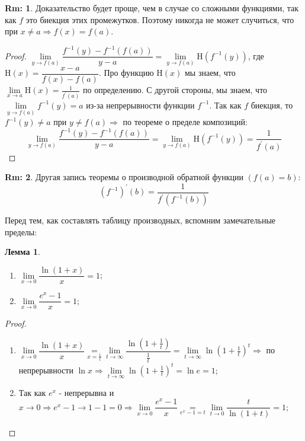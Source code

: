 \documentclass[12pt]{article}
\newcommand{\MH}{\mathrm{H}}
\theoremstyle{definition}
\newtheorem{rem}{Rm:}
\newtheorem{lemma}{Лемма}
\begin{document}
\begin{rem}
	Доказательство будет проще, чем в случае со сложными функциями, так как $f$ это биекция этих промежутков. Поэтому никогда не может случиться, что при $x\neq a \Rightarrow f(x) = f(a)$.
\end{rem}

\begin{proof}
	$\lim\limits_{y \to f(a)}\dfrac{f^{-1}(y) - f^{-1}(f(a))}{y-a} = \lim\limits_{y \to f(a)}\MH(f^{-1}(y))$, где $\MH(x) = \dfrac{x-a}{f(x) - f(a)}$. Про функцию $\MH(x)$ мы знаем, что $\lim\limits_{x \to a}\MH(x) = \frac{1}{f^\prime(a)}$ по определению.
	С другой стороны, мы знаем, что $\lim\limits_{y \to f(a)}f^{-1}(y) = a$ из-за непрерывности функции $f^{-1}$. Так как $f$ биекция, то $f^{-1}(y) \neq a$ при $y \neq f(a) \Rightarrow$ по теореме о пределе композиций: $$\lim\limits_{y \to f(a)}\dfrac{f^{-1}(y) - f^{-1}(f(a))}{y-a} = \lim\limits_{y \to f(a)}\MH(f^{-1}(y)) = \dfrac{1}{f^\prime(a)}$$
\end{proof}

\begin{rem}
	Другая запись теоремы о производной обратной функции $(f(a) = b)$:
	$$(f^{-1})^\prime(b) =\frac{1}{f^\prime(f^{-1}(b))}$$
\end{rem}

Перед тем, как составлять таблицу производных, вспомним замечательные пределы:
\begin{lemma}\hfill
	\begin{enumerate}[label={\arabic*)}]
		\item $\lim\limits_{x \to 0}\dfrac{\ln(1+x)}{x} =1$;
		\item $\lim\limits_{x \to 0}\dfrac{e^x - 1}{x} = 1$;
	\end{enumerate}
\end{lemma}
\begin{proof}\hfill
		\begin{enumerate}[label={\arabic*)}]
		\item $\lim\limits_{x \to 0}\dfrac{\ln(1+x)}{x} \underset{x = \frac{1}{t}}{=} \lim\limits_{t \to \infty}\dfrac{\ln(1+\frac{1}{t})}{\frac{1}{t}} = \lim\limits_{t \to \infty}\ln(1+\frac{1}{t})^t \Rightarrow$ по непрерывности $\ln{x} \Rightarrow  \lim\limits_{t \to \infty}\ln(1+\frac{1}{t})^t = \ln{e} = 1$;
		\item Так как $e^x$ - непрерывна и $x \to 0 \Rightarrow e^x - 1 \to 1-1 = 0 \Rightarrow\lim\limits_{x \to 0}\dfrac{e^x - 1}{x} \underset{e^x -1 = t}{=} \lim\limits_{t \to 0}\dfrac{t}{\ln{(1+t)}}=1$;
	\end{enumerate}
\end{proof}
\end{document}
